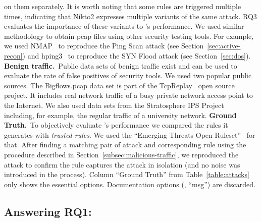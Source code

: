\documentclass[conference]{IEEEtran}
\begin{document}
\tname{} on them separately. It is worth noting that some rules are
triggered multiple times, indicating that Nikto2 expresses multiple
variants of the same attack. RQ3 evaluates the importance of these
variants to \tname{}'s performance. We used similar methodology to
obtain pcap files using other security testing tools. For example, we
used NMAP~\cite{netmap} to reproduce the Ping Scan attack (see
Section~\ref{sec:active-recon}) and hping3~\cite{hping3} to reproduce
the SYN Flood attack (see Section~\ref{sec:dos}).
\noindent\textbf{Benign traffic.}~Public data sets of benign traffic
exist and can be used to evaluate the rate of false positives of
security tools. We used two popular public sources. The Bigflows.pcap
data set is part of the TcpReplay~\cite{tcpreplay} open source
project. It includes real network traffic of a busy private network
access point to the Internet. We also used data sets from the
Stratosphere IPS Project~\cite{stratosphere-normal} including, for
example, the regular traffic of a university network.
\noindent\textbf{Ground Truth.}~To objectively evaluate \tname{}'s performance we
compared the rules it generates with \emph{trusted rules}. We used
the ``Emerging Threats Open Ruleset''~\cite{emerging-threats-open} for
that. After finding a matching pair of attack and corresponding rule
using the procedure described in
Section~\ref{subsec:malicious-traffic}, we reproduced the attack to
confirm the rule captures the attack in isolation (and no noise was
introduced in the process). Column ``Ground Truth'' from
Table~\ref{table:attacks} only shows the essential
options. Documentation options (\eg{}, ``msg'') are discarded.


\subsection{Answering RQ1: \textRQone}
\label{sec:answer-rqone}
\end{document}

